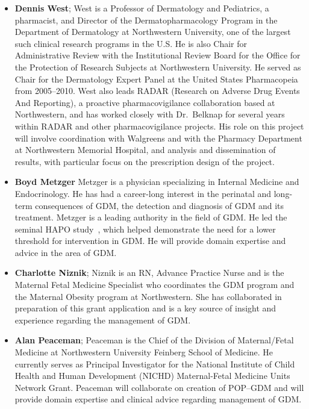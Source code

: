 \documentclass[11pt]{article}
\begin{document}
\begin{itemize}
\item\textbf{Dennis West}; West is a Professor of Dermatology and
  Pediatrics, a pharmacist, and Director of the Dermatopharmacology
  Program in the Department of Dermatology at Northwestern University,
  one of the largest such clinical research programs in the U.S. He is
  also Chair for Administrative Review with the Institutional Review
  Board for the Office for the Protection of Research Subjects at
  Northwestern University.  He served as Chair for the Dermatology
  Expert Panel at the United States Pharmacopeia from 2005--2010. West
  also leads RADAR (Research on Adverse Drug Events And Reporting), a
  proactive pharmacovigilance collaboration based at Northwestern, and
  has worked closely with Dr.\ Belknap for several years within RADAR
  and other pharmacovigilance projects. His role on this project will
  involve coordination with Walgreens and with the Pharmacy Department
  at Northwestern Memorial Hospital, and analysis and dissemination of
  results, with particular focus on the prescription design of the
  project.

\item\textbf{Boyd Metzger} Metzger is a physician specializing in
  Internal Medicine and Endocrinology. He has had a career-long
  interest in the perinatal and long-term consequences of GDM, the
  detection and diagnosis of GDM and its treatment. Metzger is a
  leading authority in the field of GDM. He led the seminal HAPO
  study~\citep{hapo}, which helped demonstrate the need for a lower
  threshold for intervention in GDM. He will provide domain expertise
  and advice in the area of GDM.

\item\textbf{Charlotte Niznik}; Niznik is an RN, Advance Practice
  Nurse and is the Maternal Fetal Medicine Specialist who coordinates
  the GDM program and the Maternal Obesity program at
  Northwestern. She has collaborated in preparation of this grant
  application and is a key source of insight and experience regarding
  the management of GDM.

\item\textbf{Alan Peaceman}; Peaceman is the Chief of the Division of
  Maternal/Fetal Medicine at Northwestern University Feinberg School
  of Medicine.  He currently serves as Principal Investigator for the
  National Institute of Child Health and Human Development (NICHD)
  Maternal-Fetal Medicine Units Network Grant. Peaceman will
  collaborate on creation of POP–GDM and will provide domain expertise
  and clinical advice regarding management of GDM.


\end{itemize}
\end{document}
